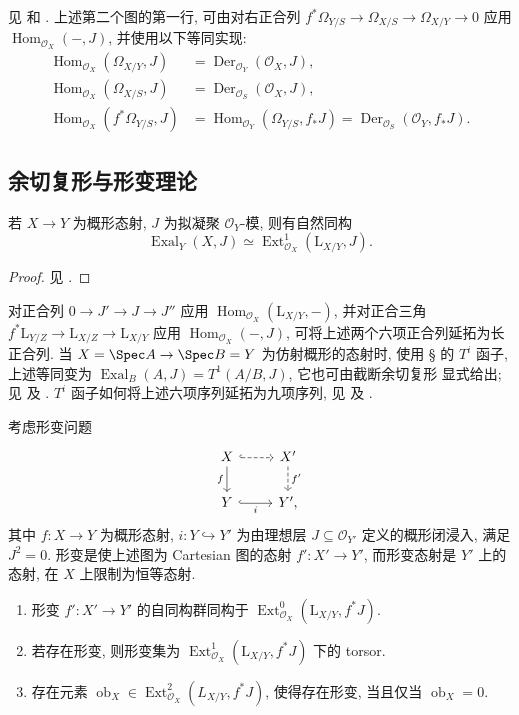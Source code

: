 \endgroup
见 \cite[$0.20.2.3$]{EGA} 和 \cite[III.$1.2.4.3$, III.$1.2.5.4$]{Ill71}. 上述第二个图的第一行, 可由对右正合列 $f^*\Omega_{Y/S}\to\Omega_{X/S}\to\Omega_{X/Y}\to0$ 应用 $\operatorname{Hom}_{\mathcal O_X}(-,J)$, 并使用以下等同实现:
\[
\begin{aligned}
\operatorname{Hom}_{\mathcal O_X}(\Omega_{X/Y},J)&=\operatorname{Der}_{\mathcal O_Y}(\mathcal O_X,J),\\
\operatorname{Hom}_{\mathcal O_X}(\Omega_{X/S},J)&=\operatorname{Der}_{\mathcal O_S}(\mathcal O_X,J),\\
\operatorname{Hom}_{\mathcal O_X}(f^*\Omega_{Y/S},J)&=\operatorname{Hom}_{\mathcal O_Y}(\Omega_{Y/S},f_*J)=\operatorname{Der}_{\mathcal O_S}(\mathcal O_Y,f_*J).
\end{aligned}
\]
\subsection{余切复形与形变理论}\label{src:C.3.4-subsection}
\begin{theorem}\label{src:C.3.5}
若 $X\to Y$ 为概形态射, $J$ 为拟凝聚 $\mathcal O_Y$-模, 则有自然同构
\[
\operatorname{Exal}_Y(X,J)\simeq\operatorname{Ext}_{\mathcal O_X}^1(\mathrm L_{X/Y},J).
\]
\end{theorem}
\begin{proof}
见 \cite[III.$1.2.3$]{Ill71}.
\end{proof}
对正合列 $0\to J'\to J\to J''$ 应用 $\operatorname{Hom}_{\mathcal O_X}(\mathrm L_{X/Y},-)$, 并对正合三角 $f^*\mathrm L_{Y/Z}\to\mathrm L_{X/Z}\to\mathrm L_{X/Y}$ 应用 $\operatorname{Hom}_{\mathcal O_X}(-,J)$, 可将上述两个六项正合列延拓为长正合列. 当 $X=\Spec A\to\Spec B=Y$ 为仿射概形的态射时, 使用 \S{} 的 $T^i$ 函子, 上述等同变为 $\operatorname{Exal}_B(A,J)=T^1(A/B,J)$, 它也可由截断余切复形  显式给出; 见 \cite[$4.2.2$]{LS67} 及 \cite[定理 $5.1$]{Har10}. $T^i$ 函子如何将上述六项序列延拓为九项序列, 见 \cite[$2.3.5$--$6$]{LS67} 及 \cite[定理 $3.4$--$5$]{Har10}.
\begin{theorem}\label{src:C.3.6}
考虑形变问题
\[
\begin{tikzcd}
X\arrow[r,hook,dashed]\arrow[d,"f"']&X'\arrow[d,dashed,"f'"]\\
Y\arrow[r,hook,"i"']&Y',
\end{tikzcd}
\]
其中 $f:X\to Y$ 为概形态射, $i:Y\hookrightarrow Y'$ 为由理想层 $J\subseteq\mathcal O_{Y'}$ 定义的概形闭浸入, 满足 $J^2=0$. 形变是使上述图为 Cartesian 图的态射 $f':X'\to Y'$, 而形变态射是 $Y'$ 上的态射, 在 $X$ 上限制为恒等态射.
\begin{enumerate}[(1)]
\item 形变 $f':X'\to Y'$ 的自同构群同构于 $\operatorname{Ext}_{\mathcal O_X}^0(\mathrm L_{X/Y},f^*J)$.
\item 若存在形变, 则形变集为 $\operatorname{Ext}_{\mathcal O_X}^1(\mathrm L_{X/Y},f^*J)$ 下的 torsor.
\item 存在元素 $\operatorname{ob}_X\in\operatorname{Ext}_{\mathcal O_X}^2(L_{X/Y},f^*J)$, 使得存在形变, 当且仅当 $\operatorname{ob}_X=0$.
\end{enumerate}
\end{theorem}
